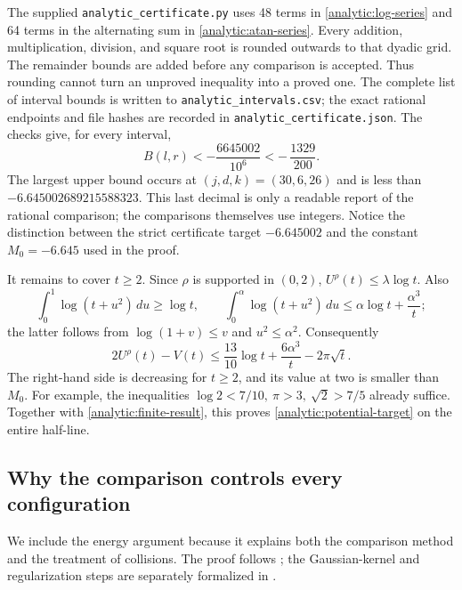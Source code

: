 The supplied \texttt{analytic\_certificate.py} uses 48 terms in
\eqref{analytic:log-series} and 64 terms in the alternating sum in
\eqref{analytic:atan-series}. Every addition, multiplication, division,
and square root is rounded outwards to that dyadic grid. The remainder
bounds are added before any comparison is accepted. Thus rounding
cannot turn an unproved inequality into a proved one.
The complete list of interval bounds is written to
\texttt{analytic\_intervals.csv}; the exact rational endpoints and file
hashes are recorded in \texttt{analytic\_certificate.json}.
The checks give, for every interval,
\begin{equation}\label{analytic:finite-result}
 B(l,r)<-\frac{6645002}{10^6}<-\,\frac{1329}{200}.
\end{equation}
The largest upper bound occurs at \((j,d,k)=(30,6,26)\) and is less than
\(-6.645002689215588323\). This last decimal is only a readable report
of the rational comparison; the comparisons themselves use integers.
Notice the distinction between the strict certificate target
\(-6.645002\) and the constant \(M_0=-6.645\) used in the proof.

It remains to cover \(t\geq2\). Since \(\rho\) is supported in \((0,2)\),
\(U^\rho(t)\leq\lambda\log t\). Also
\[
 \int_0^1\log(t+u^2)\,du\geq\log t,\qquad
 \int_0^\alpha\log(t+u^2)\,du
       \leq\alpha\log t+\frac{\alpha^3}{t};
\]
the latter follows from \(\log(1+v)\leq v\) and \(u^2\leq\alpha^2\).
Consequently
\begin{equation}\label{analytic:tail}
 2U^\rho(t)-V(t)
 \leq \frac{13}{10}\log t+\frac{6\alpha^3}{t}-2\pi\sqrt t.
\end{equation}
The right-hand side is decreasing for \(t\geq2\), and its value at two
is smaller than \(M_0\). For example, the inequalities
\(\log2<7/10,\ \pi>3,\ \sqrt2>7/5\) already suffice.
Together with \eqref{analytic:finite-result}, this proves
\eqref{analytic:potential-target} on the entire half-line.

\subsection{Why the comparison controls every configuration}

We include the energy argument because it explains both the comparison
method and the treatment of collisions.
The proof follows \cite[Lemma 6.2 and Section 6.1]{fauzan};
the Gaussian-kernel and regularization steps are separately formalized
in \cite[\texttt{Apery/Gaussian.lean},
\texttt{Apery/ZeroMass.lean}, \texttt{Apery/EnergyLimit.lean},
\texttt{Apery/EnergyFinal.lean}]{firsching}.

